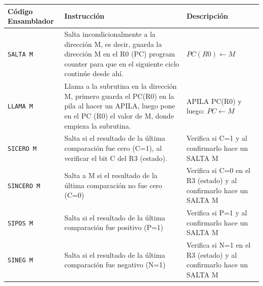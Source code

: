 \documentclass{article}
\begin{document}
\begin{longtable}{|p{}|p{}|p{}|}
  \hline
  \textbf{Código Ensamblador} & \textbf{Instrucción}                                                                                                                                                                    & \textbf{Descripción}                                                                  \\
  \hline
  \texttt{SALTA M}            & Salta incondicionalmente a la dirección M, es decir, guarda la dirección M en el R0 (PC) program counter para que en el siguiente ciclo continúe desde ahí.                             & $PC(R0) \leftarrow M$                                                                 \\
  \hline
  \texttt{LLAMA M}            & Llama a la subrutina en la dirección M, primero guarda el PC(R0) en la pila al hacer un APILA, luego pone en el PC (R0) el valor de M, donde empieza la subrutina.                      & APILA PC(R0) y luego: $PC \leftarrow M$                                               \\
  \hline
  \texttt{SICERO M}           & Salta si el resultado de la última comparación fue cero (C=1), al verificar el bit C del R3 (estado).                                                                                   & Verifica si C=1 y al confirmarlo hace un SALTA M                                      \\
  \hline
  \texttt{SINCERO M}          & Salta a M si el resultado de la última comparación no fue cero (C=0)                                                                                                                    & Verifica si C=0 en el R3 (estado) y al confirmarlo hace un SALTA M                    \\
  \hline
  \texttt{SIPOS M}            & Salta si el resultado de la última comparación fue positivo (P=1)                                                                                                                       & Verifica si P=1 y al confirmarlo hace un SALTA M                                      \\
  \hline
  \texttt{SINEG M}            & Salta si el resultado de la última comparación fue negativo (N=1)                                                                                                                       & Verifica si N=1 en el R3 (estado) y al confirmarlo hace un SALTA M                    \\

\end{longtable}
\end{document}
